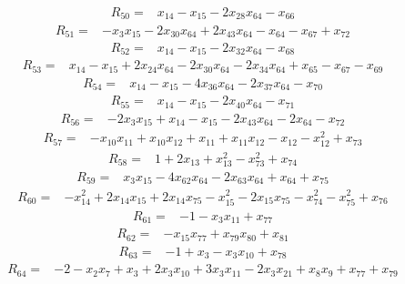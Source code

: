 \begin{align*}
 R_{50}={}&x_{14} -x_{15} -2x_{28}x_{64} -x_{66}
\end{align*}
\begin{align*}
 R_{51}={}&-x_{3}x_{15} -2x_{30}x_{64} +2x_{43}x_{64} -x_{64} -x_{67} +x_{72}
\end{align*}
\begin{align*}
 R_{52}={}&x_{14} -x_{15} -2x_{32}x_{64} -x_{68}
\end{align*}
\begin{align*}
 R_{53}={}&x_{14} -x_{15} +2x_{24}x_{64} -2x_{30}x_{64} -2x_{34}x_{64} +x_{65} -x_{67} -x_{69}
\end{align*}
\begin{align*}
 R_{54}={}&x_{14} -x_{15} -4x_{36}x_{64} -2x_{37}x_{64} -x_{70}
\end{align*}
\begin{align*}
 R_{55}={}&x_{14} -x_{15} -2x_{40}x_{64} -x_{71}
\end{align*}
\begin{align*}
 R_{56}={}&-2x_{3}x_{15} +x_{14} -x_{15} -2x_{43}x_{64} -2x_{64} -x_{72}
\end{align*}
\begin{align*}
 R_{57}={}&-x_{10}x_{11} +x_{10}x_{12} +x_{11} +x_{11}x_{12} -x_{12} -x_{12}^{2} +x_{73}
\end{align*}
\begin{align*}
 R_{58}={}&1 +2x_{13} +x_{13}^{2} -x_{73}^{2} +x_{74}
\end{align*}
\begin{align*}
 R_{59}={}&x_{3}x_{15} -4x_{62}x_{64} -2x_{63}x_{64} +x_{64} +x_{75}
\end{align*}
\begin{align*}
 R_{60}={}&-x_{14}^{2} +2x_{14}x_{15} +2x_{14}x_{75} -x_{15}^{2} -2x_{15}x_{75} -x_{74}^{2} -x_{75}^{2} +x_{76}
\end{align*}
\begin{align*}
 R_{61}={}&-1 -x_{3}x_{11} +x_{77}
\end{align*}
\begin{align*}
 R_{62}={}&-x_{15}x_{77} +x_{79}x_{80} +x_{81}
\end{align*}
\begin{align*}
 R_{63}={}&-1 +x_{3} -x_{3}x_{10} +x_{78}
\end{align*}
\begin{align*}
 R_{64}={}&-2 -x_{2}x_{7} +x_{3} +2x_{3}x_{10} +3x_{3}x_{11} -2x_{3}x_{21} +x_{8}x_{9} +x_{77} +x_{79}
\end{align*}
